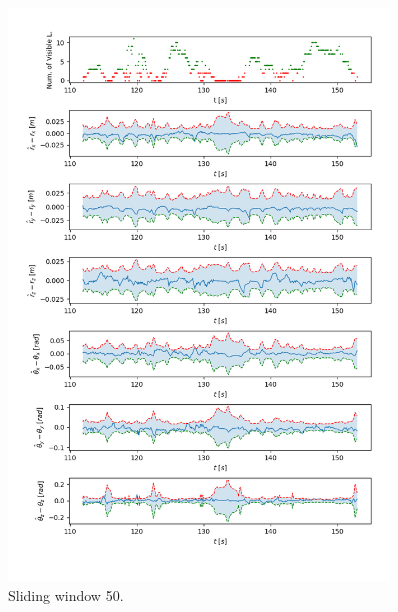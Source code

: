 \documentclass[a4paper]{article}
\begin{document}
\begin{figure}[H]
    \centering
    \includegraphics[width=0.9\textwidth]{code/sliding_window_50.png}
    \caption{Sliding window 50.}
    \label{fig:5b}
\end{figure}
\end{document}
